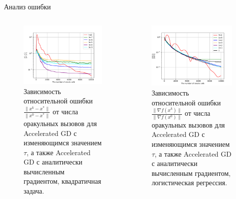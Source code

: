 \documentclass{beamer}
\begin{document}
\begin{frame}{Анализ ошибки}
\begin{columns}[c]
    \begin{figure}
    \includegraphics[width=1.0\textwidth]{Error_analysis_quadratic_sigma=1e-6.pdf}
        \caption*{Зависимость относительной ошибки $\frac{\|x^k - x^*\|}{\|x^0 - x^*\|}$ от числа оракульных вызовов для Accelerated GD с изменяющимся значением $\tau$, а также Accelerated GD с аналитически вычисленным градиентом, квадратичная задача.}
    \end{figure}

    \begin{figure}
    \includegraphics[width=1.0\textwidth]{Error_analysis_logreg_sigma=1e-6.pdf}
        \caption*{Зависимость относительной ошибки $\frac{\|\nabla f(x^k)\|}{\|\nabla f(x^0)\|}$ от числа оракульных вызовов для Accelerated GD с изменяющимся значением $\tau$, а также Accelerated GD с аналитически вычисленным градиентом, логистическая регрессия.}
    \end{figure}
\end{columns}
\end{frame}
\end{document}
